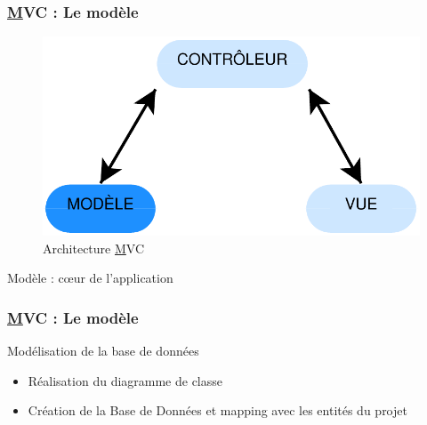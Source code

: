\speaker{\Michel}

\begin{frame}
\frametitle{\underline{M}VC : Le modèle}
\begin{figure}[!h]
	\begin{center}
	\includegraphics[scale=0.5]{images/mvcModele}
	\caption{Architecture \underline{M}VC}
	\end{center}
\end{figure}
Modèle :   cœur de l'application
\end{frame}


\begin{frame}
	\frametitle{\underline{M}VC : Le modèle}
	\begin{block}{Modélisation de la base de données}	
		\begin{itemize}
			\item Réalisation du diagramme de classe
			\item Création de la Base de Données et mapping avec les entités du projet
		\end{itemize}
	\end{block}
\end{frame}


